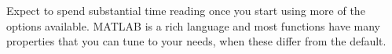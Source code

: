 Expect to spend substantial time reading once you start using more of the options available.
MATLAB is a rich language and most functions have many properties that you can tune to your needs, when these differ from the default.